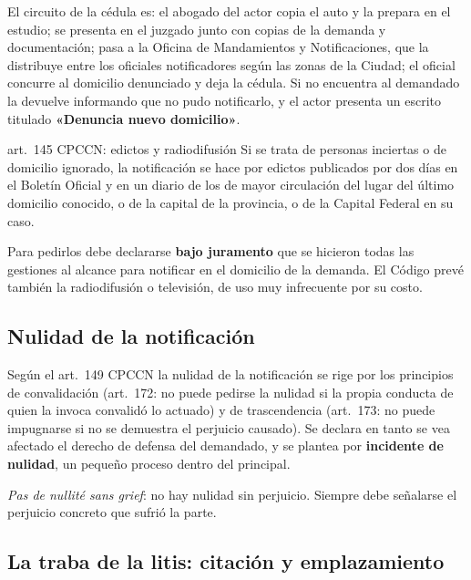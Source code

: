 \documentclass[12pt,oneside]{book}
\begin{document}
El circuito de la cédula es: el abogado del actor copia el auto y la prepara en el estudio; se presenta en el juzgado junto con copias de la demanda y documentación; pasa a la Oficina de Mandamientos y Notificaciones, que la distribuye entre los oficiales notificadores según las zonas de la Ciudad; el oficial concurre al domicilio denunciado y deja la cédula. Si no encuentra al demandado la devuelve informando que no pudo notificarlo, y el actor presenta un escrito titulado \textbf{«Denuncia nuevo domicilio»}.

\begin{regla}{art.~145 CPCCN: edictos y radiodifusión}
Si se trata de personas inciertas o de domicilio ignorado, la notificación se hace por edictos publicados por dos días en el Boletín Oficial y en un diario de los de mayor circulación del lugar del último domicilio conocido, o de la capital de la provincia, o de la Capital Federal en su caso.
\end{regla}

Para pedirlos debe declararse \textbf{bajo juramento} que se hicieron todas las gestiones al alcance para notificar en el domicilio de la demanda. El Código prevé también la radiodifusión o televisión, de uso muy infrecuente por su costo.

\subsection{Nulidad de la notificación}

Según el art.~149 CPCCN la nulidad de la notificación se rige por los principios de convalidación (art.~172: no puede pedirse la nulidad si la propia conducta de quien la invoca convalidó lo actuado) y de trascendencia (art.~173: no puede impugnarse si no se demuestra el perjuicio causado). Se declara en tanto se vea afectado el derecho de defensa del demandado, y se plantea por \textbf{incidente de nulidad}, un pequeño proceso dentro del principal.

\begin{importante}
\textit{Pas de nullité sans grief}: no hay nulidad sin perjuicio. Siempre debe señalarse el perjuicio concreto que sufrió la parte.
\end{importante}

\subsection{La traba de la litis: citación y emplazamiento}
\end{document}

